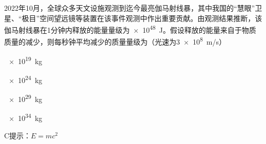 2022年10月，全球众多天文设施观测到迄今最亮伽马射线暴，其中我国的“慧眼”卫星、“极目”空间望远镜等装置在该事件观测中作出重要贡献。由观测结果推断，该伽马射线暴在1分钟内释放的能量量级为\qty{e48}{J}。假设释放的能量来自于物质质量的减少，则每秒钟平均减少的质量量级为（光速为\qty{3e8}{m/s}）\paren[]
\begin{choices}
	\item \,\qty{e19}{kg}
	\item \,\qty{e24}{kg}
	\item \,\qty{e29}{kg}
	\item \,\qty{e34}{kg}
\end{choices}
\begin{answer}
	C\qquad 提示：\(E = mc^2\)
\end{answer}